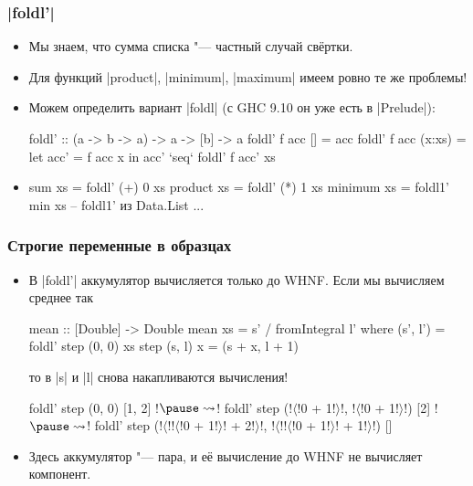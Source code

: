 \documentclass[11pt]{beamer}
\begin{document}
\begin{frame}[fragile]
  \frametitle{\haskinline|foldl'|}
  \begin{itemize}
    \item Мы знаем, что сумма списка "--- частный случай свёртки.
    \item Для функций \haskinline|product|, \haskinline|minimum|, \haskinline|maximum| имеем ровно те же проблемы!
    \item Можем определить вариант \haskinline|foldl| (с GHC 9.10 он уже есть в \haskinline|Prelude|):
          \begin{haskellsmall}
            foldl' :: (a -> b -> a) -> a -> [b] -> a
            foldl' f acc []     = acc
            foldl' f acc (x:xs) = let acc' = f acc x
                                  in acc' `seq` foldl' f acc' xs
          \end{haskellsmall}
    \item \pause
          \begin{haskellsmall}
            sum xs = foldl' (+) 0 xs
            product xs = foldl' (*) 1 xs
            minimum xs = foldl1' min xs  -- foldl1' из Data.List
            ...
          \end{haskellsmall}
  \end{itemize}
\end{frame}

\begin{frame}[fragile]
  \frametitle{Строгие переменные в образцах}
  \begin{itemize}
    \item В \haskinline|foldl'| аккумулятор вычисляется только до WHNF. Если мы вычисляем среднее так
          \begin{haskell}
            mean :: [Double] -> Double
            mean xs = s' / fromIntegral l'
              where (s', l') = foldl' step (0, 0) xs
                    step (s, l) x = (s + x, l + 1)
          \end{haskell}
          то в \haskinline|s| и \haskinline|l| снова накапливаются вычисления! \pause
          \begin{haskell}
            foldl' step (0, 0) [1, 2] !$\pause \rightsquigarrow$!
            foldl' step (!$\langle$!0 + 1!$\rangle$!, !$\langle$!0 + 1!$\rangle$!) [2] !$\pause \rightsquigarrow$!
            foldl' step (!$\langle$!!$\langle$!0 + 1!$\rangle$! + 2!$\rangle$!, !$\langle$!!$\langle$!0 + 1!$\rangle$! + 1!$\rangle$!) []
          \end{haskell}
    \item Здесь аккумулятор "--- пара, и её вычисление до WHNF не вычисляет компонент.
  \end{itemize}
\end{frame}
\end{document}
